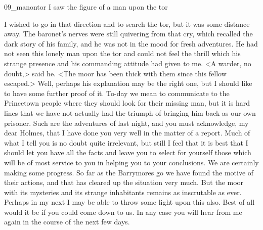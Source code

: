 \begin{letter}
	\begin{bwbigpic}
			[1.0]  
		{09_manontor}
		{I saw the figure of a man upon the tor}
	\end{bwbigpic}
\end{letter}


I wished to go in that direction and to search the tor, but it was some distance away. The baronet's nerves were still quivering from that cry, which recalled the dark story of his family, and he was not in the mood for fresh adventures. He had not seen this lonely man upon the tor and could not feel the thrill which his strange presence and his commanding attitude had given to me. <A warder, no doubt,> said he. <The moor has been thick with them since this fellow escaped.> Well, perhaps his explanation may be the right one, but I should like to have some further proof of it. To-day we mean to communicate to the Princetown people where they should look for their missing man, but it is hard lines that we have not actually had the triumph of bringing him back as our own prisoner. Such are the adventures of last night, and you must acknowledge, my dear Holmes, that I have done you very well in the matter of a report. Much of what I tell you is no doubt quite irrelevant, but still I feel that it is best that I should let you have all the facts and leave you to select for yourself those which will be of most service to you in helping you to your conclusions. We are certainly making some progress. So far as the Barrymores go we have found the motive of their actions, and that has cleared up the situation very much. But the moor with its mysteries and its strange inhabitants remains as inscrutable as ever. Perhaps in my next I may be able to throw some light upon this also. Best of all would it be if you could come down to us. In any case you will hear from me again in the course of the next few days.
